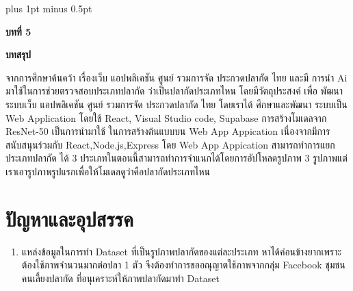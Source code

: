 
\clearpage
\thispagestyle{empty}

\begingroup
\fontsize{16pt}{19.2pt}\selectfont
\justifying
\XeTeXlinebreakskip=0pt plus 1pt minus 0.5pt
\setlength{\parindent}{1.5cm}
\setlength{\parskip}{0pt}

{}
\begin{center}
	{\bfseries\fontsize{18pt}{21.6pt}\selectfont บทที่ 5}
\end{center}

\vspace{\baselineskip}

\begin{center}
	{\bfseries\fontsize{18pt}{21.6pt}\selectfont บทสรุป}
\end{center}

\vspace{\baselineskip}

\indent จากการศึกษาค้นคว้า เรื่องเว็บ แอปพลิเคชัน ศูนย์ รวมการจัด ประกวดปลากัด ไทย และมี
การนำ Ai มาใช้ในการช่วยตรวจสอบประเภทปลากัด ว่าเป็นปลากัดประเภทไหน โดยมีวัตถุประสงค์
เพื่อ พัฒนาระบบเว็บ แอปพลิเคชัน ศูนย์ รวมการจัด ประกวดปลากัด ไทย โดยเราได้ ศึกษาและพัฒนา
ระบบเป็น Web Application โดยใช้ React, Visual Studio code, Supabase
การสร้างโมเดลจาก ResNet-50 เป็นการนำมาใช้ ในการสร้างต้นแบบบน Web App
Appication เนื่องจากมีการสนับสนุนร่วมกับ React,Node.js,Express โดย Web App Appication
สามารถทำการแยกประเภทปลากัด ได้ 3 ประเภทในตอนนี้สามารถทำการจำแนกได้โดยการอัปโหลดรูปภาพ 3 รูปภาพแต่เราเอารูปภาพรูปแรกเพื่อให้โมเดลดูว่าคือปลากัดประเภทไหน

\vspace{\baselineskip}

\section*{ปัญหาและอุปสรรค}

\begin{sloppypar}
	\begin{enumerate}
		\item แหล่งข้อมูลในการทำ Dataset ที่เป็นรูปภาพปลากัดของแต่ละประเภท หาได้ค่อนข้างยากเพราะ
		ต้องใช้ภาพจำนวนมากต่อปลา 1 ตัว จึงต้องทำการขออณุญาตใช้ภาพจากกลุ่ม Facebook ชุมชน
		คนเลี้ยงปลากัด ที่อนุเคราะห์ให้ภาพปลากัดมาทำ Dataset
	\end{enumerate}
\end{sloppypar}

